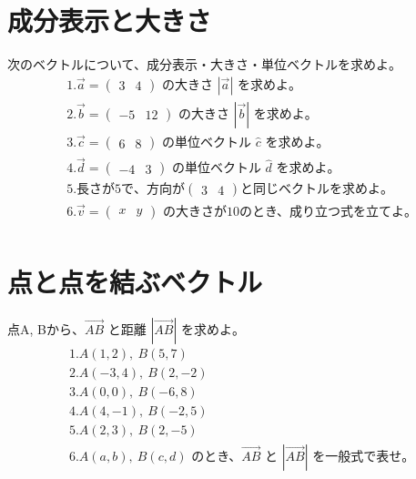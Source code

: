 \documentclass[paper=b4j,landscape,twocolumn,fleqn]{jlreq}
\begin{document}
\normalsize
\section{成分表示と大きさ}
次のベクトルについて、成分表示・大きさ・単位ベクトルを求めよ。
\begin{align*}
　&1.　\vec{a}=\begin{pmatrix}3 & 4\end{pmatrix}\text{ の大きさ }|\vec{a}|\text{ を求めよ。}\\[0.45em]
　&2.　\vec{b}=\begin{pmatrix}-5 & 12\end{pmatrix}\text{ の大きさ }|\vec{b}|\text{ を求めよ。}\\[0.45em]
　&3.　\vec{c}=\begin{pmatrix}6 & 8\end{pmatrix}\text{ の単位ベクトル }\hat{c}\text{ を求めよ。}\\[0.45em]
　&4.　\vec{d}=\begin{pmatrix}-4 & 3\end{pmatrix}\text{ の単位ベクトル }\hat{d}\text{ を求めよ。}\\[0.45em]
　&5.　長さが5で、方向が \begin{pmatrix}3 & 4\end{pmatrix} と同じベクトルを求めよ。\\[0.45em]
　&6.　\vec{v}=\begin{pmatrix}x & y\end{pmatrix}\text{ の大きさが10のとき、成り立つ式を立てよ。}\\[0.45em]
\end{align*}

\section{点と点を結ぶベクトル}
点A, Bから、\(\overrightarrow{AB}\) と距離 \(\left|\overrightarrow{AB}\right|\) を求めよ。
\begin{align*}
　&1.　A(1,2),\ B(5,7)\\[0.45em]
　&2.　A(-3,4),\ B(2,-2)\\[0.45em]
　&3.　A(0,0),\ B(-6,8)\\[0.45em]
　&4.　A(4,-1),\ B(-2,5)\\[0.45em]
　&5.　A(2,3),\ B(2,-5)\\[0.45em]
　&6.　A(a,b),\ B(c,d)\text{ のとき、}\overrightarrow{AB}\text{ と }|\overrightarrow{AB}|\text{ を一般式で表せ。}\\[0.45em]
\end{align*}
\end{document}
